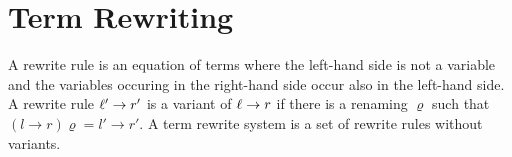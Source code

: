 \section{Term Rewriting}\label{sec:termrewriting}


\begin{definition}\label{def:rewriterule}
	A {\myem rewrite rule} is an equation of terms where the left-hand side is not a variable
	and the variables occuring in the right-hand side occur also in the left-hand side.
	A rewrite rule $\ell'\rightarrow r'$ is a {\myem variant} of $\ell\rightarrow r$ if there is a renaming $\varrho$
	such that 
	$(l\rightarrow r)\varrho = l'\rightarrow r'$.
	A {\myem term rewrite system} is a set of rewrite rules without variants.
\end{definition}
%
%
